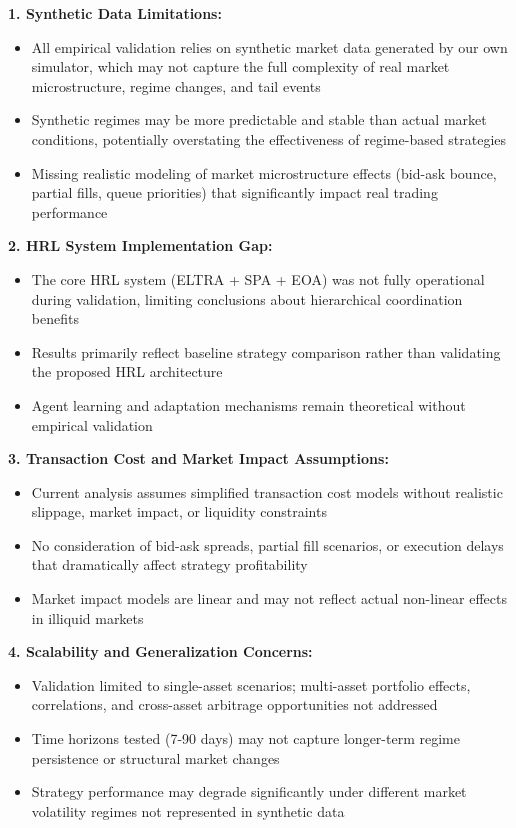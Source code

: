 \documentclass[11pt]{article}
\begin{document}
\textbf{1. Synthetic Data Limitations:}
\begin{itemize}
\item All empirical validation relies on synthetic market data generated by our own simulator, which may not capture the full complexity of real market microstructure, regime changes, and tail events
\item Synthetic regimes may be more predictable and stable than actual market conditions, potentially overstating the effectiveness of regime-based strategies
\item Missing realistic modeling of market microstructure effects (bid-ask bounce, partial fills, queue priorities) that significantly impact real trading performance

\end{itemize}
\textbf{2. HRL System Implementation Gap:}
\begin{itemize}
\item The core HRL system (ELTRA + SPA + EOA) was not fully operational during validation, limiting conclusions about hierarchical coordination benefits
\item Results primarily reflect baseline strategy comparison rather than validating the proposed HRL architecture
\item Agent learning and adaptation mechanisms remain theoretical without empirical validation

\end{itemize}
\textbf{3. Transaction Cost and Market Impact Assumptions:}
\begin{itemize}
\item Current analysis assumes simplified transaction cost models without realistic slippage, market impact, or liquidity constraints
\item No consideration of bid-ask spreads, partial fill scenarios, or execution delays that dramatically affect strategy profitability
\item Market impact models are linear and may not reflect actual non-linear effects in illiquid markets

\end{itemize}
\textbf{4. Scalability and Generalization Concerns:}
\begin{itemize}
\item Validation limited to single-asset scenarios; multi-asset portfolio effects, correlations, and cross-asset arbitrage opportunities not addressed
\item Time horizons tested (7-90 days) may not capture longer-term regime persistence or structural market changes
\item Strategy performance may degrade significantly under different market volatility regimes not represented in synthetic data

\end{itemize}
\end{document}
